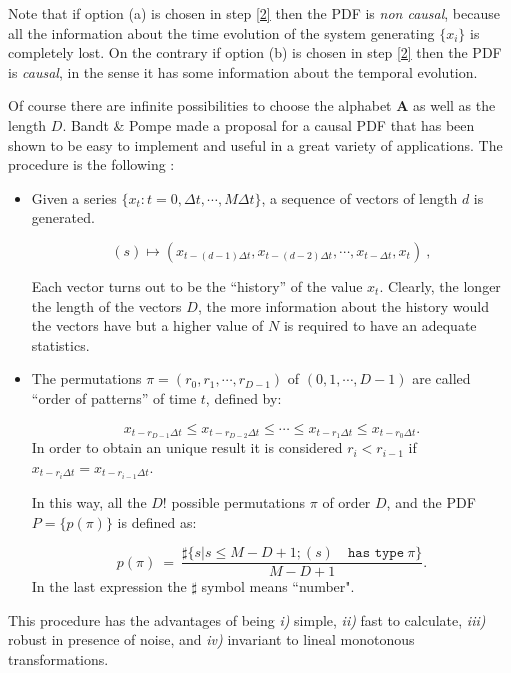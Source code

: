 Note that if option (a) is chosen in step \ref{2} then the PDF is \emph{non causal}, because all the information about the time evolution of the system generating $\{x_i\}$  is completely lost. On the contrary if option (b) is chosen in step \ref{2} then the PDF is \emph{causal}, in the sense it has some information about the temporal evolution.

 Of course there are infinite possibilities to choose the alphabet $\mathbf{ A}$ as well as the length $D$.
Bandt \& Pompe made a proposal for a causal PDF that has been shown to be easy to implement and useful in a great variety of applications.  The procedure is the
following \cite{Pompe2002,Keller2003,Keller2005}:
\begin{itemize}
\item Given a
series $\{x_t : t=0, \Delta t, \cdots,M\Delta t \}$, a sequence of
vectors of length $d$ is generated.

\begin{equation}
\label{eq:vectores}
(s)\mapsto \left(x_{t-(d-1)\Delta t},x_{t-(d-2)\Delta t},\cdots,x_{t-\Delta t},x_{t}\right) \ ,
\end{equation}

Each vector turns out to be the ``history'' of the value $x_t$.
Clearly, the longer the length of the vectors $D$, the more
information about the history would the vectors have but a higher value of $N$ is required to have an adequate statistics. 
\item The
permutations $\pi=(r_0, r_1, \cdots, r_{D-1})$ of $(0, 1, \cdots,
D-1)$ are called ``order of patterns'' of time $t$, defined by:

\begin{equation}
\label{eq:permuta}
x_{t-r_{D-1}\Delta t}\le x_{t-r_{D-2}\Delta t}\le\cdots\le x_{t-r_{1}\Delta t}\le x_{t-r_0\Delta t}.
\end{equation}
%
In order to obtain an unique result it is considered $r_i
<r_{i-1}$ if $x_{t-r_{i}\Delta t}=x_{t-r_{i-1}\Delta t}$.

In this way, all the $D!$ possible permutations $\pi$ of order
$D$, and the PDF $P=\{p(\pi)\}$ is defined as:

\begin{equation}
\label{eq:frequ}
p(\pi)~=~ \frac{\sharp \{s|s\leq M-D+1; (s) \quad \texttt{has type}~\pi\}}{M-D+1}.
\end{equation}
In the last expression the $\sharp$ symbol means ``number".
\end{itemize}
This procedure has the advantages of being {\it i)\/} simple, {\it
ii)\/} fast to calculate, {\it iii)\/} robust in presence of
noise, and {\it iv)\/} invariant to lineal monotonous
transformations.

